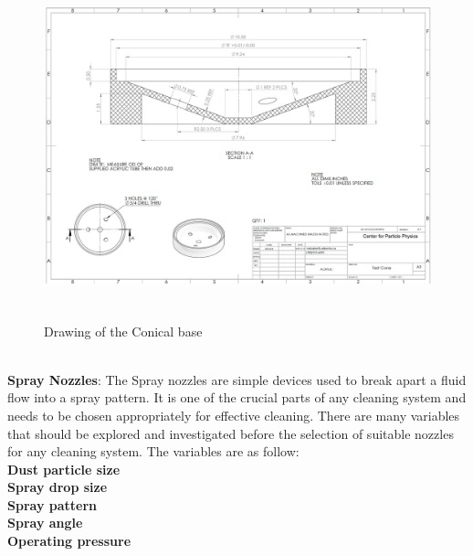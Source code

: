 \begin{figure}[!htpb]
  \centering
  \includegraphics[width = 12cm, height=10cm ]{figures/base}
  \caption{Drawing of the Conical base}
  \label{fig:base}
\end{figure}
\\
\textbf{Spray Nozzles}:
The Spray nozzles are simple devices used to break apart a fluid flow into a spray pattern. It is one of the crucial parts of any cleaning system and needs to be chosen appropriately for effective cleaning. There are many variables that should be explored and investigated before the selection of suitable nozzles for any cleaning system. The variables are as follow:\\

\textbf{Dust particle size} \\                                              

\textbf{Spray drop size}\\

\textbf{Spray pattern}\\

\textbf{Spray angle}\\

\textbf{Operating pressure}\\

